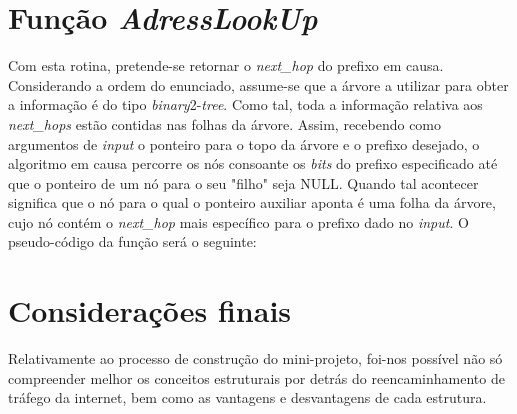 \documentclass[twocolumn]{article}
\begin{document}
\section{Função \textit{AdressLookUp}}
Com esta rotina, pretende-se retornar o \textit{next\_hop} do prefixo em causa. Considerando a ordem do enunciado, assume-se que a árvore a utilizar para obter a informação é do tipo \textit{binary}2-\textit{tree}. Como tal, toda a informação relativa aos \textit{next\_hops} estão contidas nas folhas da árvore. Assim, recebendo como argumentos de \textit{input} o ponteiro para o topo da árvore e o prefixo desejado, o algoritmo em causa percorre os nós consoante os \textit{bits} do prefixo especificado até que o ponteiro de um nó para o seu "filho" seja NULL. Quando tal acontecer significa que o nó para o qual o ponteiro auxiliar aponta é uma folha da árvore, cujo nó contém o \textit{next\_hop} mais específico para o prefixo dado no \textit{input}.
O pseudo-código da função será o seguinte:
\begin{algorithmic}
 	\Return $-1\;$
 \EndIf
 
 \State $auxiliar:=root\;$
 
 		\If{$has\_no\_"0"\_child$}{
 			\Return $auxiliar \rightarrow next\_hop\;$
 		\EndIf
 		\State $auxiliar:=auxiliar \rightarrow zero\;$
 	\Else
 		\If{$has\_no\_"1"\_child$}
 			\Return $auxiliar \rightarrow next\_hop\;$
 		\EndIf
 		\State $auxiliar:=auxiliar \rightarrow one\;$
 	\EndIf
 \EndWhile
 
 \Return -1\;
 \caption{AdressLookUp}
\end{algorithmic}
\section{Considerações finais}
Relativamente ao processo de construção do mini-projeto, foi-nos possível não só compreender melhor os conceitos estruturais por detrás do reencaminhamento de tráfego da internet, bem como as vantagens e desvantagens de cada estrutura.
\end{document}
